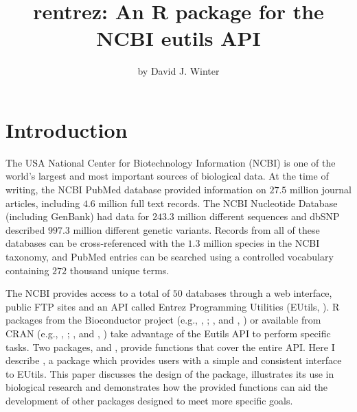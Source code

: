 \title{rentrez: An R package for the NCBI eutils API}
\author{by David J. Winter}

\maketitle


\section{Introduction}

The USA National Center for Biotechnology Information (NCBI) is one of the world's 
largest and most important sources of biological data. At the time of writing, the NCBI
PubMed database provided information on $27.5$ million journal
articles, including $4.6$ million full text records. The NCBI
Nucleotide Database (including GenBank) had data for $243.3$ million different sequences and dbSNP described $997.3$ 
million different genetic variants. Records from all of these databases can be 
cross-referenced with the $1.3$ million species in the NCBI taxonomy, and PubMed entries can be searched using a 
controlled vocabulary containing $272$ thousand unique terms. 

The NCBI provides access to a total of $50$ databases 
through a web interface, public FTP sites and an API called Entrez Programming
Utilities (EUtils, \citealt{sayers_EUtils}). R packages from the Bioconductor 
project (e.g., , \citealt{genomes}; , 
\citealt{RMassBank} and , \citealt{MeSHSim}) or available from 
CRAN (e.g., , \citealt{APE}; , \citealt{RISmed} and
, \citealt{miner}) take advantage of the Eutils API to 
perform specific tasks. Two packages,  and  
\citep{reutils}, provide functions that cover the entire API.  Here I describe 
, a package which provides users with a simple and consistent 
interface to EUtils. This paper discusses the design of the package, illustrates 
its use in biological research and demonstrates how the provided functions can 
aid the development of other packages designed to meet more specific goals.

